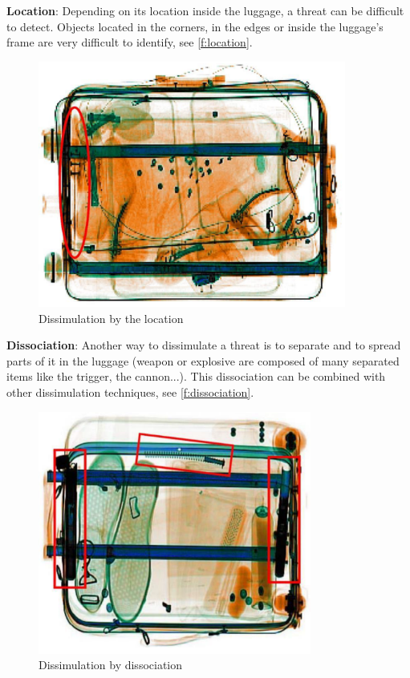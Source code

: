 \textbf{Location}: Depending on its location inside the luggage, a threat can be difficult to detect. Objects located in the corners, in the edges or inside the luggage's frame are very difficult to identify,  see  \autoref{f:location}.
\begin{figure}
\centering
	\includegraphics[width=0.9\textwidth]{Figures/positioning}
	\caption{Dissimulation by the location}
	\label{f:location}
\end{figure}

\textbf{Dissociation}: Another way to dissimulate a threat is to separate and to spread parts of it in the luggage (weapon or explosive are composed of many separated items like the trigger, the cannon...). This dissociation can be combined with other dissimulation techniques,  see  \autoref{f:dissociation}.
\begin{figure}
\centering
	\includegraphics[width=0.8\textwidth]{Figures/Dissociation}
	\caption{Dissimulation by dissociation}
	\label{f:dissociation}
\end{figure}

